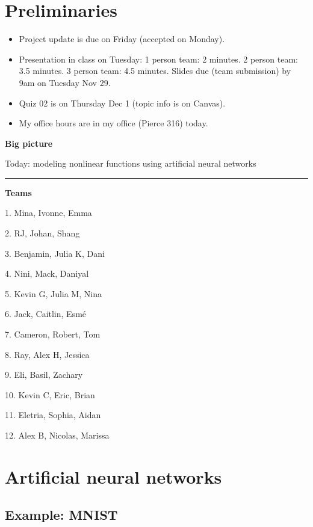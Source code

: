 \documentclass[12pt,letterpaper,noanswers]{exam}
\begin{document}
 \pdfpageheight 11in 
  \pdfpagewidth 8.5in

\noindent 

\section*{Preliminaries}


\begin{itemize}
\itemsep0pt
\item Project update is due on Friday (accepted on Monday).
\item Presentation in class on Tuesday: 1 person team: 2 minutes. 2 person team: 3.5 minutes. 3 person team: 4.5 minutes.  Slides due (team submission) by 9am on Tuesday Nov 29.
\item Quiz 02 is on Thursday Dec 1 (topic info is on Canvas).
\item My office hours are in my office (Pierce 316) today.
\end{itemize}


\noindent\textbf{Big picture}

Today: modeling nonlinear functions using artificial neural networks

\vspace{0.2cm}
\hrule
\vspace{0.2cm}


\noindent \textbf{Teams}
\begin{multicols}{3}
1. Mina, Ivonne, Emma

2.  RJ, Johan, Shang

3. Benjamin, Julia K, Dani

4. Nini, Mack, Daniyal

5. Kevin G, Julia M, Nina

6. Jack, Caitlin, Esmé

7. Cameron, Robert, Tom

8. Ray, Alex H, Jessica

9. Eli, Basil, Zachary

10.  Kevin C, Eric, Brian

11. Eletria, Sophia, Aidan

12. Alex B, Nicolas, Marissa

\end{multicols}

\section*{Artificial neural networks}


\subsection*{Example: MNIST}
\end{document}
